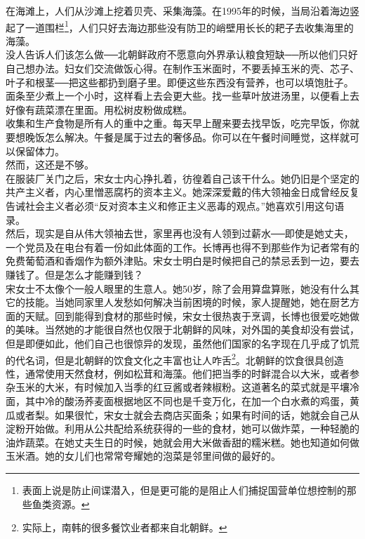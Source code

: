 在海滩上，人们从沙滩上挖着贝壳、采集海藻。在1995年的时候，当局沿着海边竖起了一道围栏\footnote{表面上说是防止间谍潜入，但是更可能的是阻止人们捕捉国营单位想控制的那些鱼类资源。}，人们只好去海边那些没有防卫的峭壁用长长的耙子去收集海里的海藻。\\

没人告诉人们该怎么做──北朝鲜政府不愿意向外界承认粮食短缺──所以他们只好自己想办法。妇女们交流做饭心得。在制作玉米面时，不要丢掉玉米的壳、芯子、叶子和根茎──把这些都扔到磨子里。即便这些东西没有营养，也可以填饱肚子。面条至少煮上一个小时，这样看上去会更大些。找一些草叶放进汤里，以便看上去好像有蔬菜漂在里面。用松树皮粉做成糕。\\

收集和生产食物是所有人的重中之重。每天早上醒来要去找早饭，吃完早饭，你就要想晚饭怎么解决。午餐是属于过去的奢侈品。你可以在午餐时间睡觉，这样就可以保留体力。\\

然而，这还是不够。\\

在服装厂关门之后，宋女士内心挣扎着，彷徨着自己该干什么。她仍旧是个坚定的共产主义者，内心里憎恶腐朽的资本主义。她深深爱戴的伟大领袖金日成曾经反复告诫社会主义者必须“反对资本主义和修正主义恶毒的观点。”她喜欢引用这句语录。\\

然后，现实是自从伟大领袖去世，家里再也没有人领到过薪水──即使是她丈夫，一个党员及在电台有着一份如此体面的工作。长博再也得不到那些作为记者常有的免费葡萄酒和香烟作为额外津贴。宋女士明白是时候把自己的禁忌丢到一边，要去赚钱了。但是怎么才能赚到钱？\\

宋女士不太像个一般人眼里的生意人。她50岁，除了会用算盘算账，她没有什么其它的技能。当她同家里人发愁如何解决当前困境的时候，家人提醒她，她在厨艺方面的天赋。回到能得到食材的那些时候，宋女士很热衷于烹调，长博也很爱吃她做的美味。当然她的才能很自然也仅限于北朝鲜的风味，对外国的美食却没有尝试，但是即便如此，他们自己也很惊异的发现，虽然他们国家的名字现在几乎成了饥荒的代名词，但是北朝鲜的饮食文化之丰富也让人咋舌\footnote{实际上，南韩的很多餐饮业者都来自北朝鲜。}。北朝鲜的饮食很具创造性，通常使用天然食材，例如松茸和海藻。他们把当季的时鲜混合以大米，或者参杂玉米的大米，有时候加入当季的红豆酱或者辣椒粉。这道著名的菜式就是平壤冷面，其中冷的酸汤荞麦面根据地区不同也是千变万化，在加一个白水煮的鸡蛋，黄瓜或者梨。如果很忙，宋女士就会去商店买面条；如果有时间的话，她就会自己从淀粉开始做。利用从公共配给系统获得的一些的食材，她可以做炸菜，一种轻脆的油炸蔬菜。在她丈夫生日的时候，她就会用大米做香甜的糯米糕。她也知道如何做玉米酒。她的女儿们也常常夸耀她的泡菜是邻里间做的最好的。\\

